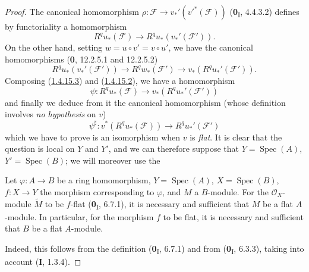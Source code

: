\begin{proof}
The canonical homomorphism
$\rho:\mathcal F\to v_*'(v'^*(\mathcal F))$ (\textbf{0}\textsubscript{I}, 4.4.3.2)
defines by functoriality a homomorphism
\begin{equation}
\label{III.1.4.15.2}
\tag{1.4.15.2}
R^qu_*(\mathcal F)\longrightarrow R^qu_*(v_*'(\mathcal F')).
\end{equation}
On the other hand, setting $w=u\circ v'=v\circ u'$, we have the
canonical homomorphisms (\textbf{0}, 12.2.5.1 and 12.2.5.2)
\begin{equation}
\label{III.1.4.15.3}
\tag{1.4.15.3}
R^qu_*(v_*'(\mathcal F'))\longrightarrow R^qw_*(\mathcal F')
\longrightarrow v_*(R^qu_*'(\mathcal F')).
\end{equation}
Composing (\hyperref[III.1.4.15.3]{1.4.15.3}) and
(\hyperref[III.1.4.15.2]{1.4.15.2}), we have a homomorphism
\[
\psi:R^qu_*(\mathcal F)\longrightarrow v_*(R^qu_*'(\mathcal F'))
\]
and finally we deduce from it the canonical homomorphism (whose definition
involves \emph{no hypothesis} on $v$)
\begin{equation}
\label{III.1.4.15.4}
\tag{1.4.15.4}
\psi^\sharp:v^*(R^qu_*(\mathcal F))\longrightarrow R^qu_*'(\mathcal F')
\end{equation}
which we have to prove is an isomorphism when $v$ is
\emph{flat}. It is clear that the question is local on $Y$ and $Y'$, and we
can therefore suppose that $Y=\operatorname{Spec}(A)$,
$Y'=\operatorname{Spec}(B)$; we will moreover use the

\begin{lemma}[1.4.15.5]
\label{III.1.4.15.5}
Let $\varphi:A\to B$ be a ring homomorphism,
$Y=\operatorname{Spec}(A)$, $X=\operatorname{Spec}(B)$,
$f:X\to Y$ the morphism corresponding to $\varphi$, and $M$ a $B$-module.
For the $\mathcal O_X$-module $\widetilde M$ to be $f$-flat
(\textbf{0}\textsubscript{I}, 6.7.1), it is necessary and sufficient that $M$ be a
flat $A$-module. In particular, for the morphism $f$ to be flat, it is
necessary and sufficient that $B$ be a flat $A$-module.
\end{lemma}

Indeed, this follows from the definition (\textbf{0}\textsubscript{I}, 6.7.1) and
from (\textbf{0}\textsubscript{I}, 6.3.3), taking into account (\textbf{I}, 1.3.4).


\end{proof}

